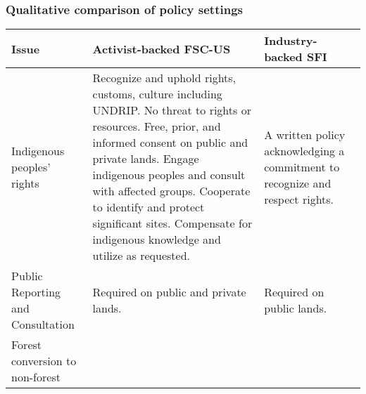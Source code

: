 \documentclass[]{article}
\title{}
\author{}
\date{}
\begin{document}
\subsubsection{Qualitative comparison of policy
settings}\label{qualitative-comparison-of-policy-settings}

\begin{longtable}[]{@{}lll@{}}
\toprule
\begin{minipage}[b]{0.20\columnwidth}\raggedright\strut
Issue\strut
\end{minipage} & \begin{minipage}[b]{0.36\columnwidth}\raggedright\strut
Activist-backed FSC-US\strut
\end{minipage} & \begin{minipage}[b]{0.36\columnwidth}\raggedright\strut
Industry-backed SFI\strut
\end{minipage}\tabularnewline
\midrule
\endhead
\begin{minipage}[t]{0.20\columnwidth}\raggedright\strut
Indigenous peoples' rights\strut
\end{minipage} & \begin{minipage}[t]{0.36\columnwidth}\raggedright\strut
Recognize and uphold rights, customs, culture including UNDRIP. No
threat to rights or resources. Free, prior, and informed consent on
public and private lands. Engage indigenous peoples and consult with
affected groups. Cooperate to identify and protect significant sites.
Compensate for indigenous knowledge and utilize as requested.\strut
\end{minipage} & \begin{minipage}[t]{0.36\columnwidth}\raggedright\strut
A written policy acknowledging a commitment to recognize and respect
rights.\strut
\end{minipage}\tabularnewline
\begin{minipage}[t]{0.20\columnwidth}\raggedright\strut
Public Reporting and Consultation\strut
\end{minipage} & \begin{minipage}[t]{0.36\columnwidth}\raggedright\strut
Required on public and private lands.\strut
\end{minipage} & \begin{minipage}[t]{0.36\columnwidth}\raggedright\strut
Required on public lands.\strut
\end{minipage}\tabularnewline
\begin{minipage}[t]{0.20\columnwidth}\raggedright\strut
Forest conversion to non-forest\strut
\end{minipage} & \begin{minipage}[t]{0.36\columnwidth}\raggedright\strut

\end{minipage}
\end{longtable}
\end{document}
